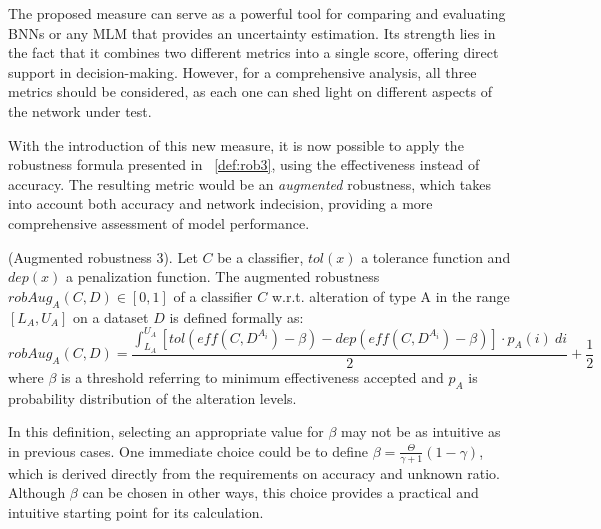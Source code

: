 The proposed measure can serve as a powerful tool for comparing and evaluating BNNs or any MLM that provides an uncertainty estimation. Its strength lies in the fact that it combines two different metrics into a single score, offering direct support in decision-making. However, for a comprehensive analysis, all three metrics should be considered, as each one can shed light on different aspects of the network under test.

With the introduction of this new measure, it is now possible to apply the robustness formula presented in \Def~\ref{def:rob3}, using the effectiveness instead of accuracy. The resulting metric would be an \textit{augmented} robustness, which takes into account both accuracy and network indecision, providing a more comprehensive assessment of model performance.

\begin{definition}\label{def:rob3} (Augmented robustness 3).
	Let $C$ be a classifier, $tol(x)$ a tolerance function and $dep(x)$ a penalization function.
	The augmented robustness $robAug_A(C,D) \in [0,1]$ of a classifier $C$ w.r.t. alteration of type A in the range $[L_A, U_A]$ on a dataset $D$ is defined formally as:
	\[
		robAug_A(C,D) = \frac{\int_{L_A}^{U_A} [tol(eff(C,D^{A_i}) - \beta) - dep(eff(C,D^{A_i}) - \beta)] \cdot p_A(i)\ di}{2} + \frac{1}{2}
	\]
	where $\beta$ is a threshold referring to minimum effectiveness accepted and $p_A$ is probability distribution of the alteration levels.
\end{definition}

In this definition, selecting an appropriate value for $\beta$ may not be as intuitive as in previous cases. One immediate choice could be to define $\beta = \frac{\Theta}{\gamma + 1}(1-\gamma)$, which is derived directly from the requirements on accuracy and unknown ratio. Although $\beta$ can be chosen in other ways, this choice provides a practical and intuitive starting point for its calculation.